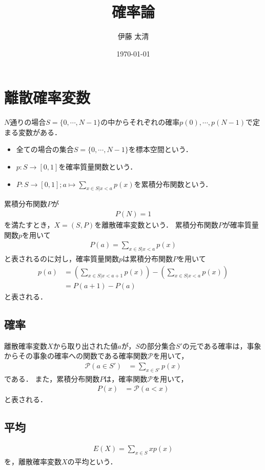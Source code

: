 \documentclass[dvipdfmx]{jsarticle}
\title{確率論}
\author{伊藤 太清}
\date{\today}
\begin{document}
 \maketitle
 \tableofcontents
 \section{離散確率変数}
$N$通りの場合$S=\{0,\cdots,N-1\}$の中からそれぞれの確率$p\left(0\right),\cdots,p\left(N-1\right)$で定まる変数がある．
 \begin{itemize}
  \item 全ての場合の集合$S=\{0,\cdots,N-1\}$を標本空間という．
  \item $p:S\to\left[0,1\right]$を確率質量関数という．
  \item $P:S\to\left[0,1\right];a\mapsto\sum_{x\in S|x<a}p\left(x\right)$を累積分布関数という．
 \end{itemize}
累積分布関数$P$が
 \begin{align}
  P\left(N\right)=1
 \end{align}
を満たすとき，$X=\left(S,P\right)$を離散確率変数という．
累積分布関数$P$が確率質量関数$p$を用いて
 \begin{align}
  P\left(a\right)=\sum_{x\in S|x<a}p\left(x\right)
 \end{align}
と表されるのに対し，確率質量関数$p$は累積分布関数$P$を用いて
 \begin{align}
  p\left(a\right)&=\left(\sum_{x\in S|x<a+1}p\left(x\right)\right)-\left(\sum_{x\in S|x<a}p\left(x\right)\right)\nonumber\\
  &=P\left(a+1\right)-P\left(a\right)
 \end{align}
と表される．
 \subsection{確率}
離散確率変数$X$から取り出された値$a$が，$S$の部分集合$S'$の元である確率は，事象からその事象の確率への関数である確率関数$\mathscr{P}$を用いて，
 \begin{align}
  \mathscr{P}\left(a\in S'\right)&=\sum_{x\in S'}p\left(x\right)
 \end{align}
である．
また，累積分布関数$P$は，確率関数$\mathscr{P}$を用いて，
 \begin{align}
  P\left(x\right)&=\mathscr{P}\left(a<x\right)
 \end{align}
と表される．
 \subsection{平均}
 \begin{align}
  E\left(X\right)=\sum_{x\in S}xp\left(x\right)
 \end{align}
を，離散確率変数$X$の平均という．
\end{document}
